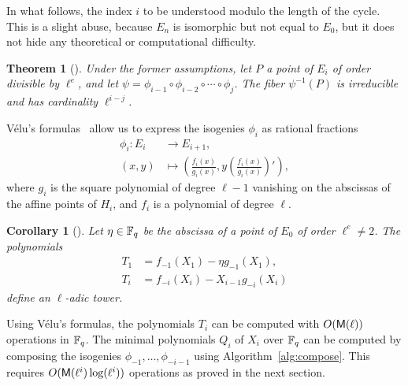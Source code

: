 \documentclass{sig-alternate}
\newtheorem{theorem}[definition]{Theorem}
\newtheorem{corollary}[definition]{Corollary}
\begin{document}
In what follows, the index $i$ to be understood modulo the length of
the cycle. This is a slight abuse, because $E_n$ is isomorphic but not
equal to $E_0$, but it does not hide any theoretical or computational
difficulty.

\begin{theorem}[{\cite[Section~4]{couveignes+lercier11}}]
  Under the former assumptions, let $P$ a point of $E_i$ of order
  divisible by $\ell^e$, and let
  $\psi=\phi_{i-1}\circ\phi_{i-2}\circ\cdots\circ\phi_{j}$. The fiber
  $\psi^{-1}(P)$ is irreducible and has cardinality $\ell^{i-j}$.
\end{theorem}

Vélu's formulas~\cite{velu71} allow us to express the isogenies
$\phi_i$ as rational fractions
\begin{equation}
  \begin{aligned}
    \phi_i: E_i &\to E_{i+1},\\
    (x,y) &\mapsto \left(\frac{f_i(x)}{g_i(x)}, y\left(\frac{f_i(x)}{g_i(x)}\right)'\right),
  \end{aligned}
\end{equation}
where $g_i$ is the square polynomial of degree $\ell-1$ vanishing on
the abscissas of the affine points of $H_i$, and $f_i$ is a polynomial
of degree $\ell$.

\begin{corollary}[{\cite[Section~4]{couveignes+lercier11}}]
  Let $\eta\in\mathbb{F}_q$ be the abscissa of a point of $E_0$ of order
  $\ell^e\ne 2$. The polynomials
  \begin{align*}
    T_1 &= f_{-1}(X_1) - \eta g_{-1}(X_1),\\
    T_i &= f_{-i}(X_i) - X_{i-1} g_{-i}(X_i)
  \end{align*}
  define an $\ell$-adic tower.
\end{corollary}

Using Vélu's formulas, the polynomials $T_i$ can be computed with
$O(\mathsf{M}(\ell))$ operations in $\mathbb{F}_q$. The minimal polynomials $Q_i$
of $X_i$ over $\mathbb{F}_q$ can be computed by composing the isogenies
$\phi_{-1},\dots,\phi_{-i-1}$ using Algorithm~\ref{alg:compose}. This
requires $O(\mathsf{M}(\ell^i)\log(\ell^i))$ operations as proved in the
next section.
\end{document}
